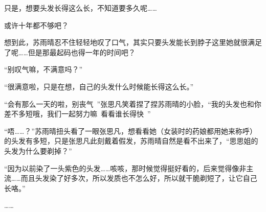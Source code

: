 只是，想要头发长得这么长，不知道要多久呢……

或许十年都不够吧？

想到此，苏雨晴忍不住轻轻地叹了口气，其实只要头发能长到脖子这里她就很满足了呢……但是那最起码也得一年的时间吧？

“别叹气嘛，不满意吗？”

“很满意啦，只是在想，自己的头发什么时候能长得这么长。”

“会有那么一天的啦，别丧气~”张思凡笑着捏了捏苏雨晴的小脸，“我的头发也和你差不多短哦，我们一起努力嘛~看看谁长得快~”

“唔……？”苏雨晴扭头看了一眼张思凡，想看看她（女装时的药娘都用她来称呼）的头发有多短，只是张思凡此刻戴着假发，苏雨晴自然是看不出来了，“思思姐的头发为什么要剃掉？”

“因为以前染了一头紫色的头发……咳咳，那时候觉得挺好看的，后来觉得像非主流……而且头发染了好多次，所以发质也不怎么好，所以就干脆剃短了，让它自己长咯。”

……
